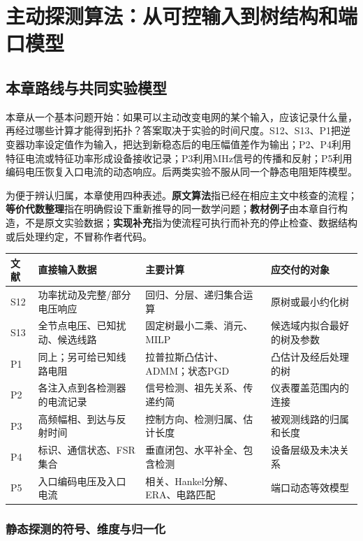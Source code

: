 \chapter{主动探测算法：从可控输入到树结构和端口模型}
\label{ch:probing}

\section{本章路线与共同实验模型}

本章从一个基本问题开始：如果可以主动改变电网的某个输入，应该记录什么量，再经过哪些计算才能得到拓扑？答案取决于实验的时间尺度。S12、S13、P1把逆变器功率设定值作为输入，把达到新稳态后的电压幅值差作为输出；P2、P4利用特征电流或特征功率形成设备接收记录；P3利用MHz信号的传播和反射；P5利用编码电压恢复入口电流的动态响应。后两类实验不服从同一个静态电阻矩阵模型。

为便于辨认归属，本章使用四种表述。\textbf{原文算法}指已经在相应主文中核查的流程；\textbf{等价代数整理}指在明确假设下重新推导的同一数学问题；\textbf{教材例子}由本章自行构造，不是原文实验数据；\textbf{实现补充}指为使流程可执行而补充的停止检查、数据结构或后处理约定，不冒称作者代码。

\begin{center}
\small
\begin{tabularx}{\textwidth}{@{}lXXX@{}}
\toprule
文献 & 直接输入数据 & 主要计算 & 应交付的对象\\
\midrule
S12 & 功率扰动及完整/部分电压响应 & 回归、分层、递归集合运算 & 原树或最小约化树\\
S13 & 全节点电压、已知扰动、候选线路 & 固定树最小二乘、消元、MILP & 候选域内拟合最好的树及参数\\
P1 & 同上；另可给已知线路电阻 & 拉普拉斯凸估计、ADMM；状态PGD & 凸估计及经后处理的树\\
P2 & 各注入点到各检测器的电流记录 & 信号检测、祖先关系、传递约简 & 仪表覆盖范围内的连接\\
P3 & 高频幅相、到达与反射时间 & 控制方向、检测归属、估计长度 & 被观测线路的归属和长度\\
P4 & 标识、通信状态、FSR集合 & 垂直闭包、水平补全、包含检测 & 设备层级及未决关系\\
P5 & 入口编码电压及入口电流 & 相关、Hankel分解、ERA、电路匹配 & 端口动态等效模型\\
\bottomrule
\end{tabularx}
\end{center}

\subsection{静态探测的符号、维度与归一化}

